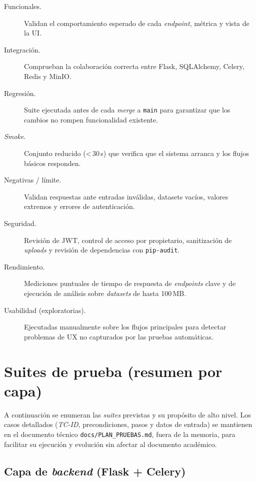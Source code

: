 \begin{description}
  \item[Funcionales.]  Validan el comportamiento esperado de cada
        \emph{endpoint}, métrica y vista de la \acs{UI}.
  \item[Integración.]  Comprueban la colaboración correcta entre Flask,
        SQLAlchemy, Celery, Redis y MinIO.
  \item[Regresión.]  Suite ejecutada antes de cada \emph{merge} a
        \texttt{main} para garantizar que los cambios no rompen
        funcionalidad existente.
  \item[\emph{Smoke}.]  Conjunto reducido (\textless\,30\,s) que verifica
        que el sistema arranca y los flujos básicos responden.
  \item[Negativas / límite.]  Validan respuestas ante entradas inválidas,
        datasets vacíos, valores extremos y errores de autenticación.
  \item[Seguridad.]  Revisión de \acs{JWT}, control de acceso por
        propietario, sanitización de \emph{uploads} y revisión de
        dependencias con \texttt{pip-audit}.
  \item[Rendimiento.]  Mediciones puntuales de tiempo de respuesta de
        \emph{endpoints} clave y de ejecución de análisis sobre
        \emph{datasets} de hasta 100\,\acs{MB}.
  \item[Usabilidad (exploratorias).]  Ejecutadas manualmente sobre los
        flujos principales para detectar problemas de \acs{UX} no
        capturados por las pruebas automáticas.
\end{description}


\section{Suites de prueba (resumen por capa)}
\label{sec:anx-pruebas-suites}

A continuación se enumeran las \emph{suites} previstas y su propósito de
alto nivel.  Los casos detallados (\emph{TC-ID}, precondiciones, pasos y
datos de entrada) se mantienen en el documento técnico
\texttt{docs/PLAN\_PRUEBAS.md}, fuera de la memoria, para facilitar su
ejecución y evolución sin afectar al documento académico.

\subsection{Capa de \emph{backend} (Flask + Celery)}

